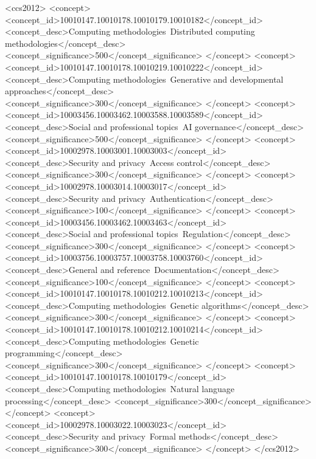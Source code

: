 \documentclass[manuscript,screen,9pt]{acmart}
\begin{document}
\begin{CCSXML}
<ccs2012>
<concept>
<concept_id>10010147.10010178.10010179.10010182</concept_id>
<concept_desc>Computing methodologies~Distributed computing methodologies</concept_desc>
<concept_significance>500</concept_significance>
</concept>
<concept>
<concept_id>10010147.10010178.10010219.10010222</concept_id>
<concept_desc>Computing methodologies~Generative and developmental approaches</concept_desc>
<concept_significance>300</concept_significance>
</concept>
<concept>
<concept_id>10003456.10003462.10003588.10003589</concept_id>
<concept_desc>Social and professional topics~AI governance</concept_desc>
<concept_significance>500</concept_significance>
</concept>
<concept>
<concept_id>10002978.10003001.10003003</concept_id>
<concept_desc>Security and privacy~Access control</concept_desc>
<concept_significance>300</concept_significance>
</concept>
<concept>
<concept_id>10002978.10003014.10003017</concept_id>
<concept_desc>Security and privacy~Authentication</concept_desc>
<concept_significance>100</concept_significance>
</concept>
<concept>
<concept_id>10003456.10003462.10003463</concept_id>
<concept_desc>Social and professional topics~Regulation</concept_desc>
<concept_significance>300</concept_significance>
</concept>
<concept>
<concept_id>10003756.10003757.10003758.10003760</concept_id>
<concept_desc>General and reference~Documentation</concept_desc>
<concept_significance>100</concept_significance>
</concept>
<concept>
<concept_id>10010147.10010178.10010212.10010213</concept_id>
<concept_desc>Computing methodologies~Genetic algorithms</concept_desc>
<concept_significance>300</concept_significance>
</concept>
<concept>
<concept_id>10010147.10010178.10010212.10010214</concept_id>
<concept_desc>Computing methodologies~Genetic programming</concept_desc>
<concept_significance>300</concept_significance>
</concept>
<concept>
<concept_id>10010147.10010178.10010179</concept_id>
<concept_desc>Computing methodologies~Natural language processing</concept_desc>
<concept_significance>300</concept_significance>
</concept>
<concept>
<concept_id>10002978.10003022.10003023</concept_id>
<concept_desc>Security and privacy~Formal methods</concept_desc>
<concept_significance>300</concept_significance>
</concept>
</ccs2012>
\end{CCSXML}

\end{document}
